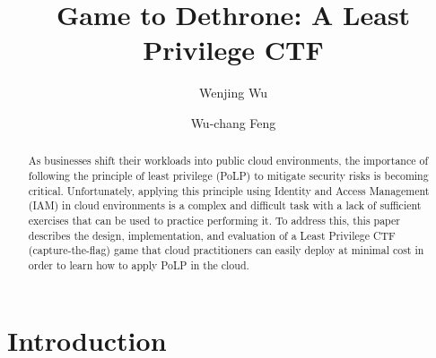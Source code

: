 \documentclass[sigconf]{acmart}
\begin{document}
\title{Game to Dethrone: A Least Privilege CTF}

\author{Wenjing Wu}
\author{Wu-chang Feng}


\begin{abstract}
	As businesses shift their workloads into public cloud environments, the importance of following the principle of least privilege (PoLP) to mitigate security risks is becoming critical.  Unfortunately, applying this principle using Identity and Access Management (IAM) in cloud environments is a complex and difficult task with a lack of sufficient exercises that can be used to practice performing it.  To address this, this paper describes the design, implementation, and evaluation of a Least Privilege CTF (capture-the-flag) game that cloud practitioners can easily  deploy at minimal cost in order to learn how to apply PoLP in the cloud.
\end{abstract}




\maketitle
\pagestyle{plain}

\section{Introduction}
\end{document}
